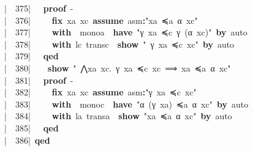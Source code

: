 \documentclass{article}
\newcommand{\syntaxKEYWORDA}[1]{\textcolor[rgb]{0.0,0.4,0.6}{\textbf{#1}}}
\newcommand{\syntaxKEYWORDC}[1]{\textcolor[rgb]{0.0,0.6,1.0}{\textbf{#1}}}
\newcommand{\syntaxLITERALA}[1]{\textcolor[rgb]{1.0,0.0,0.8}{#1}}
\newcommand{\syntaxOPERATOR}[1]{\textcolor[rgb]{0.0,0.0,0.0}{\textbf{#1}}}
\newcommand{\syntaxKEYWORDA}[1]{\textcolor[rgb]{0.0,0.4,0.6}{\textbf{#1}}}
\newcommand{\syntaxKEYWORDC}[1]{\textcolor[rgb]{0.0,0.6,1.0}{\textbf{#1}}}
\newcommand{\syntaxLITERALA}[1]{\textcolor[rgb]{1.0,0.0,0.8}{#1}}
\newcommand{\syntaxOPERATOR}[1]{\textcolor[rgb]{0.0,0.0,0.0}{\textbf{#1}}}
\newcommand{\syntaxKEYWORDA}[1]{\textcolor[rgb]{0.0,0.4,0.6}{\textbf{#1}}}
\newcommand{\syntaxKEYWORDC}[1]{\textcolor[rgb]{0.0,0.6,1.0}{\textbf{#1}}}
\newcommand{\syntaxLITERALA}[1]{\textcolor[rgb]{1.0,0.0,0.8}{#1}}
\newcommand{\syntaxOPERATOR}[1]{\textcolor[rgb]{0.0,0.0,0.0}{\textbf{#1}}}
\newcommand{\syntaxKEYWORDA}[1]{\textcolor[rgb]{0.0,0.4,0.6}{#1}}
\newcommand{\syntaxKEYWORDC}[1]{\textcolor[rgb]{0.0,0.6,1.0}{#1}}
\newcommand{\syntaxLITERALA}[1]{\textcolor[rgb]{1.0,0.0,0.8}{\textbf{#1}}}
\newcommand{\syntaxOPERATOR}[1]{\textcolor[rgb]{0.0,0.0,0.0}{#1}}
\newcommand{\syntaxKEYWORDA}[1]{\textcolor[rgb]{0.0,0.4,0.6}{\textbf{#1}}}
\newcommand{\syntaxKEYWORDC}[1]{\textcolor[rgb]{0.0,0.6,1.0}{\textbf{#1}}}
\newcommand{\syntaxLITERALA}[1]{\textcolor[rgb]{1.0,0.0,0.8}{#1}}
\newcommand{\syntaxOPERATOR}[1]{\textcolor[rgb]{0.0,0.0,0.0}{\textbf{#1}}}
\newcommand{\syntaxKEYWORDA}[1]{\textcolor[rgb]{0.0,0.4,0.6}{\textbf{#1}}}
\newcommand{\syntaxKEYWORDC}[1]{\textcolor[rgb]{0.0,0.6,1.0}{\textbf{#1}}}
\newcommand{\syntaxLITERALA}[1]{\textcolor[rgb]{1.0,0.0,0.8}{#1}}
\newcommand{\syntaxOPERATOR}[1]{\textcolor[rgb]{0.0,0.0,0.0}{\textbf{#1}}}
\newcommand{\syntaxKEYWORDA}[1]{\textcolor[rgb]{0.0,0.0,0.0}{#1}}
\newcommand{\syntaxKEYWORDC}[1]{\textcolor[rgb]{0.0,0.0,0.0}{#1}}
\newcommand{\gutter}[1]{\textcolor[rgb]{0,0,0}{{|}#1}}
\newcommand{\gutterH}[1]{\textcolor[rgb]{1,0,0}{{|}#1}}
\begin{document}
\gutterH{\ \ 375{|}\ }{\ }{\ }\syntaxKEYWORDA{proof}{\ }{-}\hspace*{\fill}\\
\gutter{\ \ 376{|}\ }{\ }{\ }{\ }{\ }\syntaxKEYWORDC{fix}{\ }xa{\ }xc{\ }\syntaxKEYWORDC{assume}{\ }asm\syntaxOPERATOR{:}\syntaxLITERALA{"xa{\ }≼a{\ }α{\ }xc"}{\ }{\ }\hspace*{\fill}\\
\gutter{\ \ 377{|}\ }{\ }{\ }{\ }{\ }\syntaxKEYWORDA{with}{\ }{\ }monoa{\ }{\ }\syntaxKEYWORDA{have}{\ }\syntaxLITERALA{"γ{\ }xa{\ }≼c{\ }γ{\ }(α{\ }xc)"}{\ }\syntaxKEYWORDA{by}{\ }auto\hspace*{\fill}\\
\gutter{\ \ 378{|}\ }{\ }{\ }{\ }{\ }\syntaxKEYWORDA{with}{\ }lc{\ }transc{\ }{\ }\syntaxKEYWORDC{show}{\ }\syntaxLITERALA{"{\ }γ{\ }xa{\ }≼c{\ }xc"}{\ }\syntaxKEYWORDA{by}{\ }auto\hspace*{\fill}\\
\gutter{\ \ 379{|}\ }{\ }{\ }\syntaxKEYWORDA{qed}\hspace*{\fill}\\
\gutterH{\ \ 380{|}\ }{\ }{\ }{\ }\syntaxKEYWORDC{show}{\ }\syntaxLITERALA{"{\ }⋀xa{\ }xc.{\ }γ{\ }xa{\ }≼c{\ }xc{\ }⟹{\ }xa{\ }≼a{\ }α{\ }xc"}\hspace*{\fill}\\
\gutter{\ \ 381{|}\ }{\ }{\ }\syntaxKEYWORDA{proof}{\ }{-}\hspace*{\fill}\\
\gutter{\ \ 382{|}\ }{\ }{\ }{\ }{\ }\syntaxKEYWORDC{fix}{\ }xa{\ }xc{\ }\syntaxKEYWORDC{assume}{\ }asm\syntaxOPERATOR{:}\syntaxLITERALA{"γ{\ }xa{\ }≼c{\ }xc"}{\ }{\ }\hspace*{\fill}\\
\gutter{\ \ 383{|}\ }{\ }{\ }{\ }{\ }\syntaxKEYWORDA{with}{\ }{\ }monoc{\ }{\ }\syntaxKEYWORDA{have}{\ }\syntaxLITERALA{"α{\ }(γ{\ }xa){\ }≼a{\ }α{\ }xc"}{\ }\syntaxKEYWORDA{by}{\ }auto\hspace*{\fill}\\
\gutter{\ \ 384{|}\ }{\ }{\ }{\ }{\ }\syntaxKEYWORDA{with}{\ }la{\ }transa{\ }{\ }\syntaxKEYWORDC{show}{\ }\syntaxLITERALA{"xa{\ }≼a{\ }α{\ }xc"}{\ }\syntaxKEYWORDA{by}{\ }auto\hspace*{\fill}\\
\gutterH{\ \ 385{|}\ }{\ }{\ }\syntaxKEYWORDA{qed}\hspace*{\fill}\\
\gutter{\ \ 386{|}\ }\syntaxKEYWORDA{qed}\hspace*{\fill}\\
\end{document}
